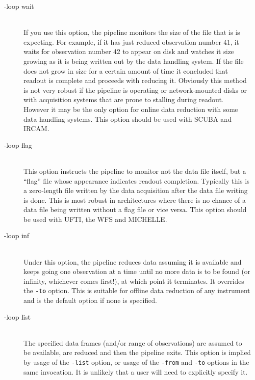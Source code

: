 \documentclass[twoside,11pt]{article}
\renewcommand{\_}{\texttt{\symbol{95}}}
\begin{document}
\begin{description}

\item[-loop wait]
\hfil\\
If you use this option, the pipeline monitors the size of the file
that is is expecting. For example, if it has just reduced observation
number 41, it waits for observation number 42 to appear on disk and
watches it size growing as it is being written out by the data
handling system. If the file does not grow in size for a certain
amount of time it concluded that readout is complete and proceeds with
reducing it. Obviously this method is not very robust if the pipeline
is operating or network-mounted disks or with acquisition systems that
are prone to stalling during readout. However it may be the only
option for online data reduction with some data handling systems. This
option should be used with SCUBA and IRCAM.

\item[-loop flag]
\hfil\\
This option instructs the pipeline to monitor not the data file
itself, but a ``flag'' file whose appearance indicates readout
completion. Typically this is a zero-length file written by the data
acquisition after the data file writing is done. This is most robust
in architectures where there is no chance of a data file being written
without a flag file or vice versa. This option should be used with
UFTI, the WFS and MICHELLE.

\item[-loop inf]
\hfil\\
Under this option, the pipeline reduces data assuming it is available
and keeps going one observation at a time until no more data is to be
found (or infinity, whichever comes first!), at which point it
terminates. It overrides the {\tt -to} option. This is suitable for offline
data reduction of any instrument and is the default option if none is
specified.

\item[-loop list]
\hfil\\
The specified data frames (and/or range of observations) are assumed
to be available, are reduced and then the pipeline exits. This option
is implied by usage of the {\tt -list} option, or usage of the {\tt -from}
and {\tt -to} options in the same invocation. It is unlikely that a user
will need to explicitly specify it.

\end{description}
\end{document}

